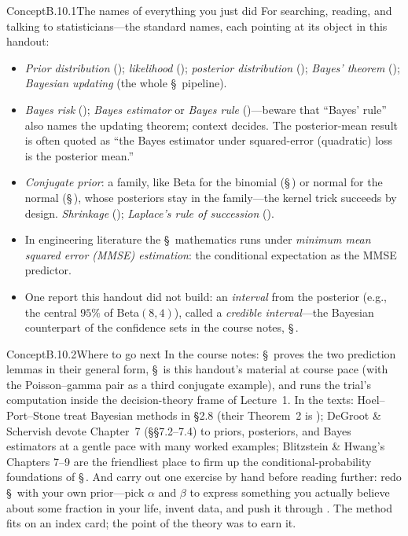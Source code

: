 \documentclass[main.tex]{subfiles}
\begin{document}
\begin{ObjL}{Concept}{B.10.1}{The names of everything you just did}
For searching, reading, and talking to statisticians---the standard names, each pointing at
its object in this handout:
\begin{itemize}[leftmargin=1.8em,itemsep=2pt,topsep=2pt]
  \item \emph{Prior distribution} (); \emph{likelihood} ();
        \emph{posterior distribution} (); \emph{Bayes' theorem} ();
        \emph{Bayesian updating} (the whole \S\, pipeline).
  \item \emph{Bayes risk} (); \emph{Bayes estimator} or \emph{Bayes rule}
        ()---beware that ``Bayes' rule'' also names the updating theorem;
        context decides. The posterior-mean result is often quoted as ``the Bayes estimator
        under squared-error (quadratic) loss is the posterior mean.''
  \item \emph{Conjugate prior}: a family, like Beta for the binomial (\S\,) or
        normal for the normal (\S\,), whose posteriors stay in the family---the
        kernel trick succeeds by design. \emph{Shrinkage} ();
        \emph{Laplace's rule of succession} ().
  \item In engineering literature the \S\, mathematics runs under \emph{minimum
        mean squared error (MMSE) estimation}: the conditional expectation as the MMSE
        predictor.
  \item One report this handout did not build: an \emph{interval} from the posterior (e.g.,
        the central $95\%$ of Beta$(8,4)$), called a \emph{credible interval}---the
        Bayesian counterpart of the confidence sets in the course notes,
        \S\,.
\end{itemize}
\end{ObjL}

\begin{ObjL}{Concept}{B.10.2}{Where to go next}
In the course notes: \S\, proves the two prediction lemmas in their general form,
\S\, is this handout's material at course pace (with the Poisson--gamma pair as
a third conjugate example), and  runs the trial's computation inside the
decision-theory frame of Lecture~1. In the texts: Hoel--Port--Stone treat Bayesian methods
in \S 2.8 (their Theorem~2 is ); DeGroot \& Schervish devote Chapter~7
(\S\S 7.2--7.4) to priors, posteriors, and Bayes estimators at a gentle pace with many
worked examples; Blitzstein \& Hwang's Chapters 7--9 are the friendliest place to firm up
the conditional-probability foundations of \S\,. And carry out one exercise by
hand before reading further: redo \S\, with your own prior---pick $\alpha$ and
$\beta$ to express something you actually believe about some fraction in your life, invent
data, and push it through . The method fits on an index card; the point of the
theory was to earn it.
\end{ObjL}

\ifSubfilesClassLoaded{\clearpage\objindex}{}
\end{document}
